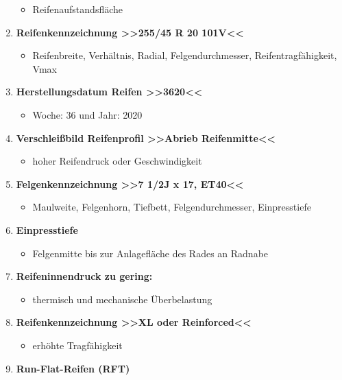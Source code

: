 \begin{enumerate}
  \begin{itemize}
  \item
    Reifenaufstandsfläche
  \end{itemize}
\item
  \textbf{Reifenkennzeichnung >>255/45 R 20 101V<<}

  \begin{itemize}
  \item
    Reifenbreite, Verhältnis, Radial, Felgendurchmesser,
    Reifentragfähigkeit, Vmax
  \end{itemize}
\item
  \textbf{Herstellungsdatum Reifen >>3620<<}

  \begin{itemize}
  \item
    Woche: 36 und Jahr: 2020
  \end{itemize}
\item
  \textbf{Verschleißbild Reifenprofil >>Abrieb Reifenmitte<<}

  \begin{itemize}
  \item
    hoher Reifendruck oder Geschwindigkeit
  \end{itemize}
\item
  \textbf{Felgenkennzeichnung >>7 1/2J x 17, ET40<<}

  \begin{itemize}
  \item
    Maulweite, Felgenhorn, Tiefbett, Felgendurchmesser, Einpresstiefe
  \end{itemize}
\item
  \textbf{Einpresstiefe}

  \begin{itemize}
  \item
    Felgenmitte bis zur Anlagefläche des Rades an Radnabe
  \end{itemize}
\item
  \textbf{Reifeninnendruck zu gering:}

  \begin{itemize}
  \item
    thermisch und mechanische Überbelastung
  \end{itemize}
\item
  \textbf{Reifenkennzeichnung >>XL oder Reinforced<<}

  \begin{itemize}
  \item
    erhöhte Tragfähigkeit
  \end{itemize}
\item
  \textbf{Run-Flat-Reifen (RFT)}


\end{enumerate}
